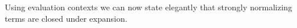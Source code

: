 \documentclass{article}
\newcommand{\csn}{\mathsf{sn}}
\newcommand{\red}{\longrightarrow}
\begin{document}
%



Using evaluation contexts we can now state elegantly that strongly normalizing terms are closed under expansion.

\end{document}
